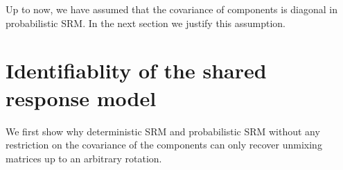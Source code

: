 

  Up to now, we have assumed that the covariance of components is diagonal in
  probabilistic SRM. In the next section we justify this assumption.

\section{Identifiablity of the shared response model}
We first show why deterministic SRM and probabilistic SRM without any
restriction on the covariance of the components can
only recover unmixing matrices up to an arbitrary rotation.

